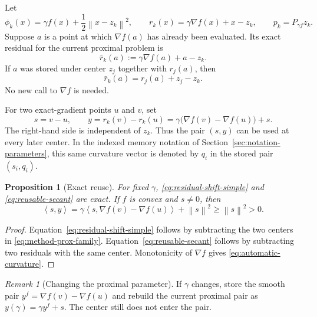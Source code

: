 \documentclass[10pt,leqno]{amsart}
\numberwithin{equation}{section}
\numberwithin{algorithm}{section}
\newtheorem{proposition}[theorem]{Proposition}
\theoremstyle{remark}
\newtheorem{remark}[theorem]{Remark}
\newcommand{\norm}[1]{\left\lVert #1 \right\rVert}
\newcommand{\ip}[2]{\left\langle #1,#2 \right\rangle}
\newcommand{\grad}{\nabla}
\begin{document}
Let
\begin{equation}
\label{eq:method-prox-family}
    \phi_k(x)=\gamma f(x)+\frac12\norm{x-z_k}^2,
    \qquad
    r_k(x)=\gamma\grad f(x)+x-z_k,
    \qquad
    p_k=P_{\gamma f}z_k.
\end{equation}
Suppose $a$ is a point at which $\grad f(a)$ has already been evaluated.  Its exact residual for the current proximal problem is
\begin{equation}
\label{eq:exact-residual-transport}
    \bar r_k(a):=\gamma\grad f(a)+a-z_k.
\end{equation}
If $a$ was stored under center $z_j$ together with $r_j(a)$, then
\begin{equation}
\label{eq:residual-shift-simple}
    \bar r_k(a)=r_j(a)+z_j-z_k.
\end{equation}
No new call to $\grad f$ is needed.

For two exact-gradient points $u$ and $v$, set
\begin{equation}
\label{eq:reusable-secant}
    s=v-u,
    \qquad
    y=r_k(v)-r_k(u)
      =\gamma\bigl(\grad f(v)-\grad f(u)\bigr)+s.
\end{equation}
The right-hand side is independent of $z_k$.  Thus the pair $(s,y)$ can be used at every later center.  In the indexed memory notation of Section~\ref{sec:notation-parameters}, this same curvature vector is denoted by $q_i$ in the stored pair $(s_i,q_i)$.

\begin{proposition}[Exact reuse]
\label{prop:exact-reuse}
For fixed $\gamma$, \eqref{eq:residual-shift-simple} and \eqref{eq:reusable-secant} are exact.  If $f$ is convex and $s\ne0$, then
\begin{equation}
\label{eq:automatic-curvature}
    \ip{s}{y}
    =\gamma\ip{s}{\grad f(v)-\grad f(u)}+\norm{s}^2
    \ge \norm{s}^2>0.
\end{equation}
\end{proposition}

\begin{proof}
Equation~\eqref{eq:residual-shift-simple} follows by subtracting the two centers in \eqref{eq:method-prox-family}.  Equation~\eqref{eq:reusable-secant} follows by subtracting two residuals with the same center.  Monotonicity of $\grad f$ gives \eqref{eq:automatic-curvature}.
\end{proof}

\begin{remark}[Changing the proximal parameter]
If $\gamma$ changes, store the smooth pair
$y^f=\grad f(v)-\grad f(u)$ and rebuild the current proximal pair as
$y(\gamma)=\gamma y^f+s$.  The center still does not enter the pair.
\end{remark}
\end{document}
